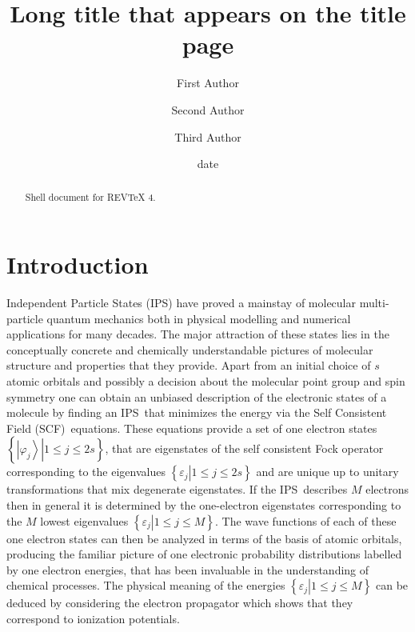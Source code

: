 \documentclass[aps,preprint]{revtex4}%
\begin{document}
\title[Short title for running header]{Long title that appears on the title page}
\author{First Author}
\author{Second Author}
\author{Third Author}

\begin{abstract}
Shell document for REV\TeX{} 4.

\end{abstract}
\date[Date text]{date}




\maketitle
\tableofcontents


\section{ Introduction \label{intro}}

Independent Particle States (IPS) have proved a mainstay of molecular
multi-particle quantum mechanics both in physical modelling and numerical
applications for many decades. The major attraction of these states lies in
the conceptually concrete and chemically understandable pictures of molecular
structure and properties that they provide. Apart from an initial choice of
$s$ atomic orbitals and possibly a decision about the molecular point group
and spin symmetry one can obtain an unbiased description of the electronic
states of a molecule by finding an IPS\ that minimizes the energy via the Self
Consistent Field (SCF)\ equations. These equations provide a set of one
electron states $\left\{  \left.  \left\vert \varphi_{j}\right\rangle
\right\vert 1\leq j\leq2s\right\}  $, that are eigenstates of the self
consistent Fock operator corresponding to the eigenvalues $\left\{  \left.
\varepsilon_{j}\right\vert 1\leq j\leq2s\right\}  $ and are unique up to
unitary transformations that mix degenerate eigenstates. If the IPS\ describes
$M$ electrons then in general it is determined by the one-electron eigenstates
corresponding to the $M$ lowest eigenvalues $\left\{  \left.  \varepsilon
_{j}\right\vert 1\leq j\leq M\right\}  $. The wave functions of each of these
one electron states can then be analyzed in terms of the basis of atomic
orbitals, producing the familiar picture of one electronic probability
distributions labelled by one electron energies, that has been invaluable in
the understanding of chemical processes. The physical meaning of the energies
$\left\{  \left.  \varepsilon_{j}\right\vert 1\leq j\leq M\right\}  $ can be
deduced by considering the electron propagator \cite{ortiz} which shows that
they correspond to ionization potentials.
\end{document}
